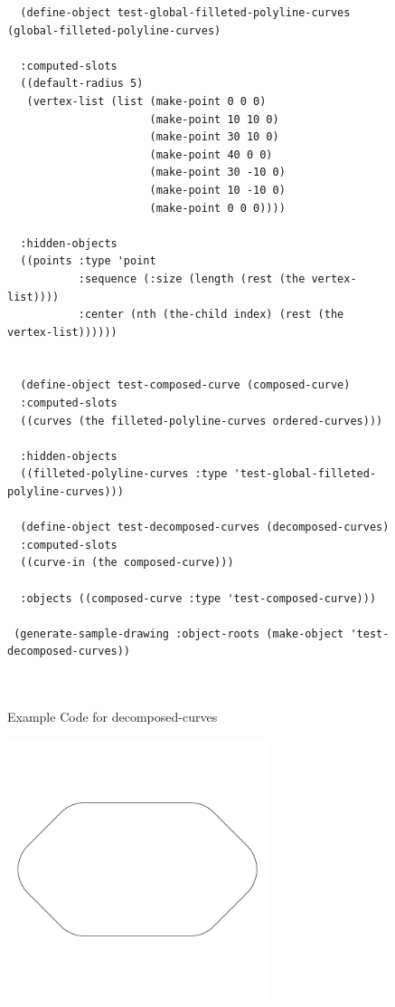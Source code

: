 \documentclass [11pt]{book}
\begin{document}
\begin{itemize}
\begin{figure}
\begin{lrbox}{\boxedverb}
\begin{minipage}{\linewidth}
{\begin{verbatim}
  (define-object test-global-filleted-polyline-curves (global-filleted-polyline-curves)
                    
  :computed-slots
  ((default-radius 5)
   (vertex-list (list (make-point 0 0 0)
                      (make-point 10 10 0)
                      (make-point 30 10 0)
                      (make-point 40 0 0)
                      (make-point 30 -10 0)
                      (make-point 10 -10 0)
                      (make-point 0 0 0))))

  :hidden-objects
  ((points :type 'point
           :sequence (:size (length (rest (the vertex-list))))
           :center (nth (the-child index) (rest (the vertex-list))))))


  (define-object test-composed-curve (composed-curve)
  :computed-slots
  ((curves (the filleted-polyline-curves ordered-curves)))
  
  :hidden-objects
  ((filleted-polyline-curves :type 'test-global-filleted-polyline-curves)))

  (define-object test-decomposed-curves (decomposed-curves)
  :computed-slots
  ((curve-in (the composed-curve)))
  
  :objects ((composed-curve :type 'test-composed-curve)))

 (generate-sample-drawing :object-roots (make-object 'test-decomposed-curves))

 
\end{verbatim}}
\end{minipage}
\end{lrbox}
\fbox{\usebox{\boxedverb}}

\caption{Example Code for decomposed-curves}

\label{fig:example-code-decomposed-curves}

\end{figure}

\begin{figure}
\begin{center}
\includegraphics[width=3in,height=3in]{../images/example-decomposed-curves.pdf}
\end{center}


\end{figure}
\end{itemize}
\end{document}
